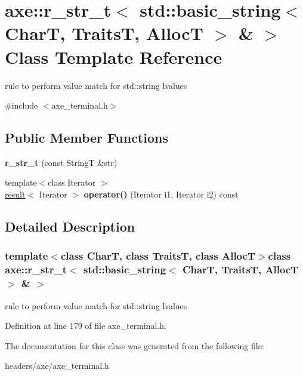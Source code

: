 \hypertarget{classaxe_1_1r__str__t_3_01std_1_1basic__string_3_01CharT_00_01TraitsT_00_01AllocT_01_4_01_6_01_4}{\section{axe\+:\+:r\+\_\+str\+\_\+t$<$ std\+:\+:basic\+\_\+string$<$ Char\+T, Traits\+T, Alloc\+T $>$ \& $>$ Class Template Reference}
\label{classaxe_1_1r__str__t_3_01std_1_1basic__string_3_01CharT_00_01TraitsT_00_01AllocT_01_4_01_6_01_4}
}


rule to perform value match for std\+::string lvalues  




{\ttfamily \#include $<$axe\+\_\+terminal.\+h$>$}

\subsection*{Public Member Functions}
\begin{DoxyCompactItemize}
\item 
\hypertarget{classaxe_1_1r__str__t_3_01std_1_1basic__string_3_01CharT_00_01TraitsT_00_01AllocT_01_4_01_6_01_4_aaaac60ee12c33e6996edadf978329d42}{{\bfseries r\+\_\+str\+\_\+t} (const String\+T \&str)}\label{classaxe_1_1r__str__t_3_01std_1_1basic__string_3_01CharT_00_01TraitsT_00_01AllocT_01_4_01_6_01_4_aaaac60ee12c33e6996edadf978329d42}

\item 
\hypertarget{classaxe_1_1r__str__t_3_01std_1_1basic__string_3_01CharT_00_01TraitsT_00_01AllocT_01_4_01_6_01_4_a08a853e1dfe85ff03928a7c244df8df1}{{\footnotesize template$<$class Iterator $>$ }\\\hyperlink{structaxe_1_1result}{result}$<$ Iterator $>$ {\bfseries operator()} (Iterator i1, Iterator i2) const }\label{classaxe_1_1r__str__t_3_01std_1_1basic__string_3_01CharT_00_01TraitsT_00_01AllocT_01_4_01_6_01_4_a08a853e1dfe85ff03928a7c244df8df1}

\end{DoxyCompactItemize}


\subsection{Detailed Description}
\subsubsection*{template$<$class Char\+T, class Traits\+T, class Alloc\+T$>$class axe\+::r\+\_\+str\+\_\+t$<$ std\+::basic\+\_\+string$<$ Char\+T, Traits\+T, Alloc\+T $>$ \& $>$}

rule to perform value match for std\+::string lvalues 

Definition at line 179 of file axe\+\_\+terminal.\+h.



The documentation for this class was generated from the following file\+:\begin{DoxyCompactItemize}
\item 
headers/axe/axe\+\_\+terminal.\+h\end{DoxyCompactItemize}
